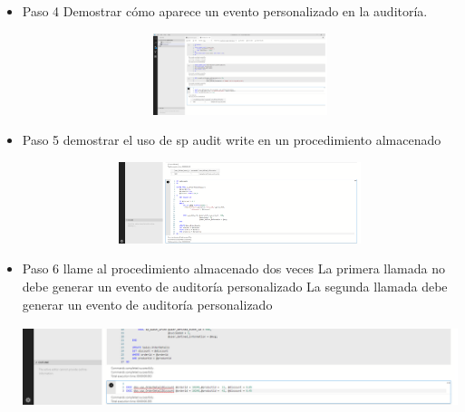 \begin{itemize}
   		   \item Paso 4 Demostrar cómo aparece un evento personalizado en la auditoría.
				 
				 	
					\begin{center}
    				\includegraphics[width=16cm, height=90]{./Imagenes/Imagen__23}
   				    \end{center}
   				    
   		  \item Paso 5 demostrar el uso de sp audit write en un procedimiento almacenado
				 
				 	
					\begin{center}
    				\includegraphics[width=16cm, height=90]{./Imagenes/Imagen__24}
   				    \end{center}
   				    
   	      
   	      \item Paso 6 llame al procedimiento almacenado dos veces La primera llamada no debe generar un evento de auditoría personalizado La segunda llamada debe generar un evento de auditoría personalizado
				 
				 	
					\begin{center}
    				\includegraphics[width=16cm, height=90]{./Imagenes/Imagen__25}
   				    \end{center}
   				    

\end{itemize}
